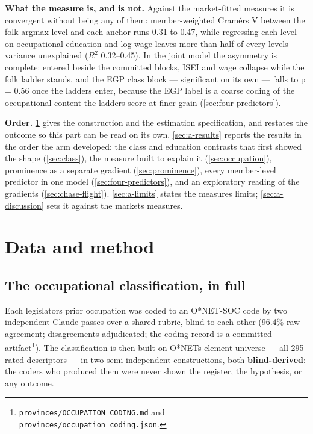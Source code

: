 \textbf{What the measure is, and is not.} Against the market-fitted measures it is
convergent without being any of them: member-weighted Cramér\textquotesingle s V between the
folk argmax level and each anchor runs 0.31 to 0.47, while regressing each level on
occupational education and log wage leaves more than half of every level\textquotesingle s
variance unexplained (\(R^{2}\) 0.32--0.45). In the joint model the asymmetry is
complete: entered beside the committed blocks, ISEI and wage collapse while
the folk ladder stands, and the EGP class block --- significant on its own ---
falls to p = 0.56 once the ladders enter, because the EGP label is a coarse
coding of the occupational content the ladders score at finer grain (\cref{sec:four-predictors}).

\textbf{Order.} \cref{sec:a-method} gives the construction and the estimation specification, and
restates the outcome so this part can be read on its own. \cref{sec:a-results} reports the
results in the order the arm developed: the class and education contrasts
that first showed the shape (\cref{sec:class}), the measure built to explain it (\cref{sec:occupation}),
prominence as a separate gradient (\cref{sec:prominence}), every member-level predictor in
one model (\cref{sec:four-predictors}), and an exploratory reading of the gradients (\cref{sec:chase-flight}). \cref{sec:a-limits}
states the measure\textquotesingle s limits; \cref{sec:a-discussion} sets it against the market\textquotesingle s measures.

\section{Data and method}\label{sec:a-method}

\subsection{The occupational classification, in full}\label{sec:occ-classification}

Each legislator\textquotesingle s prior occupation was coded to an O*NET-SOC code by two
independent Claude passes over a shared rubric, blind to each other (96.4\%
raw agreement; disagreements adjudicated; the coding record is a committed
artifact\footnote{\texttt{provinces/\allowbreak{}OCCUPATION\_\allowbreak{}CODING.\allowbreak{}md} and
  \texttt{provinces/\allowbreak{}occupation\_\allowbreak{}coding.\allowbreak{}json}.}). The classification is then built on O*NET\textquotesingle s element
universe --- all 295 rated descriptors --- in two semi-independent
constructions, both \textbf{blind-derived}: the coders who produced them were
never shown the register, the hypothesis, or any outcome.

